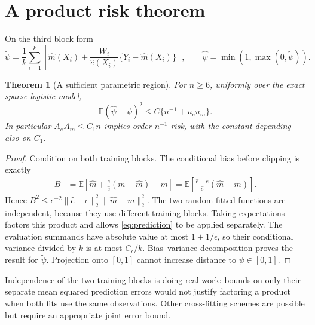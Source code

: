 \documentclass[11pt,a4paper]{article}
\newtheorem{theorem}{Theorem}[section]
\theoremstyle{definition}
\theoremstyle{remark}
\newcommand{\E}{\mathbb E}
\begin{document}
\section{A product risk theorem}
On the third block form
\[
 \widetilde\psi=\frac1k\sum_{i=1}^k
 \left[\hat m(X_i)+\frac{W_i}{\hat e(X_i)}
                          \{Y_i-\hat m(X_i)\}\right],
 \qquad \hat\psi=\min(1,\max(0,\widetilde\psi)).
\]
\begin{theorem}[A sufficient parametric region]
For $n\ge6$, uniformly over the exact sparse logistic model,
\[
 \E(\hat\psi-\psi)^2\le C\{n^{-1}+u_eu_m\}.
\]
In particular $A_eA_m\le C_1n$ implies order-$n^{-1}$ risk, with the constant depending also on $C_1$.
\end{theorem}
\begin{proof}
Condition on both training blocks. The conditional bias before clipping is exactly
\begin{align*}
 B&=\E\left[\hat m+\frac e{\hat e}(m-\hat m)-m\right]
   =\E\left[\frac{\hat e-e}{\hat e}(\hat m-m)\right].
\end{align*}
Hence $B^2\le\epsilon^{-2}\|\hat e-e\|_2^2\|\hat m-m\|_2^2$.
The two random fitted functions are independent, because they use different training blocks. Taking expectations factors this product and allows \eqref{eq:prediction} to be applied separately. The evaluation summands have absolute value at most $1+1/\epsilon$, so their conditional variance divided by $k$ is at most $C_\epsilon/k$. Bias--variance decomposition proves the result for $\widetilde\psi$. Projection onto $[0,1]$ cannot increase distance to $\psi\in[0,1]$.
\end{proof}

Independence of the two training blocks is doing real work: bounds on only their separate mean squared prediction errors would not justify factoring a product when both fits use the same observations. Other cross-fitting schemes are possible but require an appropriate joint error bound.
\end{document}
